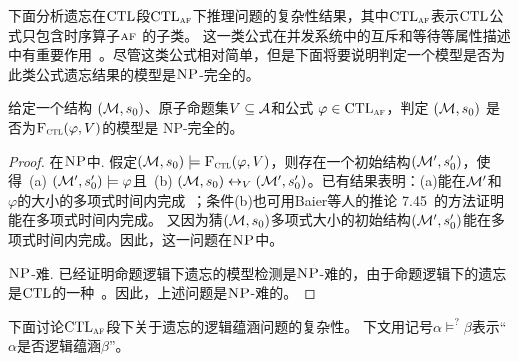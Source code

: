 下面分析遗忘在$\textrm{CTL}$段$\textrm{CTL}_{\textsc{a}\textsc{f}}$下推理问题的复杂性结果，其中$\textrm{CTL}_{\textsc{a}\textsc{f}}$表示$\textrm{CTL}$公式只包含时序算子$\textsc{a} \textsc{f}$ 的子类。
这一类公式在并发系统中的互斥和等待等属性描述中有重要作用~\cite{Baier:PMC:2008}。尽管这类公式相对简单，但是下面将要说明判定一个模型是否为此类公式遗忘结果的模型是$\textsc{NP}$-完全的。
\begin{proposition}[模型检测]
	\label{modelChecking}
	给定一个结构 $({\cal M},s_0)$、原子命题集$V\subseteq{\cal A}$和公式 $\varphi \in \textrm{CTL}_{\textsc{a}\textsc{f}}$，判定 $({\cal M},s_0)$ 是否为${\textsc{F}_{\textsc{ctl}}}(\varphi, V)$的模型是 \textsc{NP}-完全的。
\end{proposition}
\begin{proof}
	在$\textsc{NP}$中. 假定$({\cal M},s_0) \models {\textsc{F}_{\textsc{ctl}}}(\varphi,V)$，则存在一个初始结构$({\cal M}', s_0')$，使得\ (a) $({\cal M}',s_0') \models \varphi$且\ (b) $({\cal M},s_0) \leftrightarrow_V ({\cal M}',s_0')$。已有结果表明：(a)能在${\cal M}'$和 $\varphi$的大小的多项式时间内完成~\cite{DBLP:books/daglib/0007403}；条件(b)也可用Baier等人的推论 7.45~\cite{Baier:PMC:2008}的方法证明能在多项式时间内完成。
	又因为猜$({\cal M},s_0)$多项式大小的初始结构$({\cal M}',s_0')$能在多项式时间内完成。因此，这一问题在$\textsc{NP}$中。
	
	$\textsc{NP}$-难. 已经证明命题逻辑下遗忘的模型检测是$\textsc{NP}$-难的，由于命题逻辑下的遗忘是$\textrm{CTL}$的一种~\cite{Zhang2008Properties}。因此，上述问题是$\textsc{NP}$-难的。
\end{proof}

下面讨论$\textrm{CTL}_{\textsc{a}\textsc{f}}$段下关于遗忘的逻辑蕴涵问题的复杂性。
下文用记号$\alpha \models^? \beta$表示“$\alpha$是否逻辑蕴涵$\beta$”。

